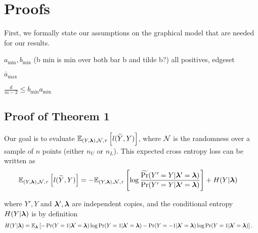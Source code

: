 

\section{Proofs}

First, we formally state our assumptions on the graphical model that are needed for our results.

\begin{assumption}
$a_{\min}, b_{\min}$ (b min is min over both bar b and tilde b?) all positives, edgeset 

$\bar{a}_{\max}$

$\frac{d}{m - 2} \le b_{\min} a_{\min}$

\end{assumption}

\subsection{Proof of Theorem 1}

Our goal is to evaluate $\mathbb{E}_{(Y, \bm{\lambda}), \mathcal{N}, \tau}\left[l(\widetilde{Y}, Y)\right]$, where $\mathcal{N}$ is the randomness over a sample of $n$ points (either $n_U$ or $n_L$). This expected cross entropy loss can be written as
\begin{align}
    \mathbb{E}_{(Y, \bm{\lambda}), \mathcal{N}, \tau}\left[l(\widetilde{Y}, Y)\right] &= - \mathbb{E}_{(Y, \bm{\lambda}), \mathcal{N}, \tau}\left[ \log \frac{\widetilde{\Pr}(Y' = Y | \bm{\lambda}' = \bm{\lambda})}{\Pr(Y' = Y | \bm{\lambda}' = \bm{\lambda})}\right] + H(Y | \bm{\lambda}) \label{eq:cross-entropy}
\end{align}

where $Y', Y$ and $\bm{\lambda}', \bm{\lambda}$ are independent copies, and the conditional entropy $H(Y | \bm{\lambda})$ is by definition
\begin{align}
    H(Y | \bm{\lambda}) &= \mathbb{E}_{\bm{\lambda}}\left[- \Pr(Y = 1 | \bm{\lambda}' = \bm{\lambda}) \log \Pr(Y = 1 | \bm{\lambda}' = \bm{\lambda}) - \Pr(Y = -1 | \bm{\lambda}' = \bm{\lambda}) \log \Pr(Y = 1 | \bm{\lambda}' = \bm{\lambda})\right].
\end{align}

